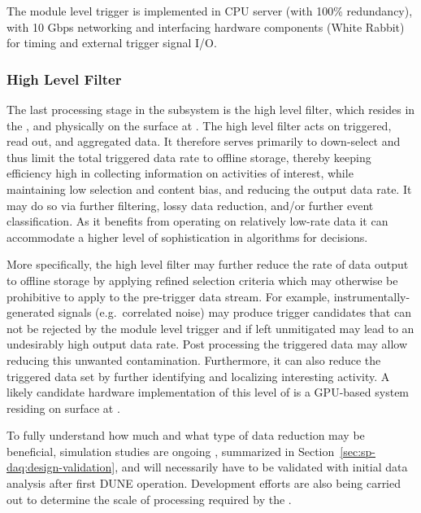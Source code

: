The module level trigger is implemented in  CPU server (with 100\%
redundancy), with 10 Gbps networking and interfacing hardware components (White
Rabbit) for timing and external trigger signal I/O.

\subsubsection{High Level Filter}
\label{sec:fd-daq:design-data-reduction}

The last processing stage in the  subsystem is the
high level filter, which resides in the , and physically
on the surface at .
The high level filter acts on triggered, read out, and aggregated data. 
It therefore serves primarily to down-select and thus
limit the total triggered data rate to offline storage, thereby keeping 
efficiency high in collecting information on activities of interest,
while maintaining low selection and content bias, and reducing the output data
rate. It may do so via 
further filtering, lossy data reduction, and/or further event
classification.
As it benefits from operating on relatively low-rate data it can accommodate a higher level of
sophistication in algorithms for  decisions.

More specifically, the high level filter may further reduce the rate of data output to offline storage by
applying refined selection criteria which may otherwise be prohibitive
to apply to the pre-trigger data stream.  For example, instrumentally-generated signals (e.g.~correlated noise)
may produce trigger candidates that can not be rejected by the module
level trigger and if left unmitigated may lead to an undesirably high
output data rate. 
Post processing the triggered data may allow reducing this unwanted
contamination.
Furthermore, it can also reduce the triggered data set by further identifying
and localizing interesting activity. A likely candidate hardware
implementation of this level of  is a GPU-based system
residing on surface at .

To fully understand how much and what type of data reduction may be
beneficial, simulation studies are ongoing \cite{bib:docdb11311},
summarized in Section~\ref{sec:sp-daq:design-validation}, and will
necessarily have to be
validated with initial data analysis after
first DUNE  operation. Development efforts are also being
carried out to determine the scale of 
processing required by the .


